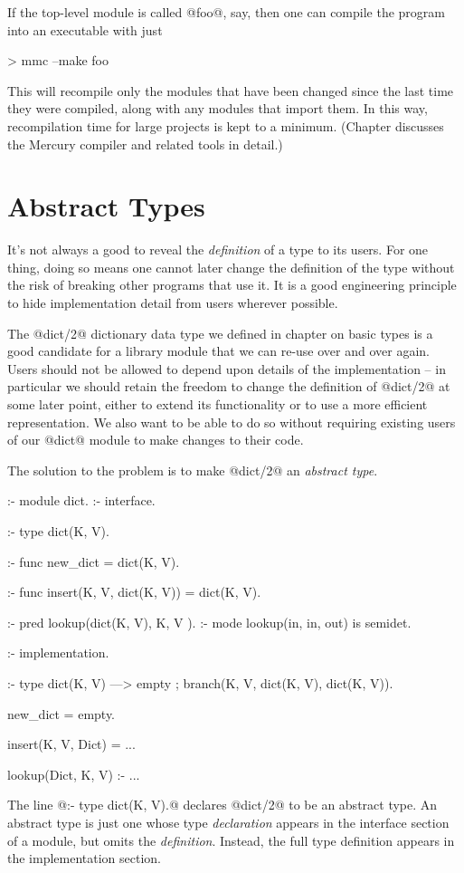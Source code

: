 If the top-level module is called @foo@, say, then one can compile the
program into an executable with just
\begin{myverbatim}
> mmc --make foo
\end{myverbatim}
This will recompile only the modules that have been changed since the
last time they were compiled, along with any modules that import them.
In this way, recompilation time for large projects is kept to a minimum.
(Chapter \XXX{} discusses the Mercury compiler and related tools in
detail.)

\section{Abstract Types}

It's not always a good to reveal the \emph{definition} of a type to its
users.  For one thing, doing so means one cannot later change the
definition of the type without the risk of breaking other programs that use
it.  It is a good engineering principle to hide implementation detail
from users wherever possible.

The @dict/2@ dictionary data type we defined in chapter \XXX{} on basic
types is a good candidate for a library module that we can re-use over and
over again.  Users should not be allowed to depend upon details of the
implementation -- in particular we should retain the freedom to change
the definition of @dict/2@ at some later point, either to extend its
functionality or to use a more efficient representation.  We also want
to be able to do so without requiring existing users of our @dict@
module to make changes to their code.

The solution to the problem is to make @dict/2@ an \emph{abstract type}.
\begin{myverbatim}
:- module dict.
:- interface.


:- type dict(K, V).     %

:- func new_dict = dict(K, V).

:- func insert(K, V, dict(K, V)) = dict(K, V).

:- pred lookup(dict(K, V), K,  V  ).
:- mode lookup(in,         in, out) is semidet.


:- implementation.


:- type dict(K, V)      %
    --->    empty
    ;       branch(K, V, dict(K, V), dict(K, V)).

new_dict = empty.

insert(K, V, Dict) = ...

lookup(Dict, K, V) :- ...
\end{myverbatim}
The line @:- type dict(K, V).@ declares @dict/2@ to be an abstract type.
An abstract type is just one whose type \emph{declaration} appears in
the interface section of a module, but omits the \emph{definition}.
Instead, the full type definition appears in the implementation section.


